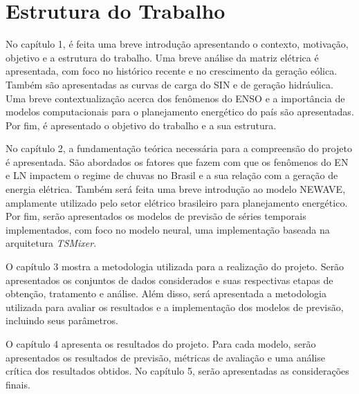 \section{Estrutura do Trabalho}
No capítulo 1, é feita uma breve introdução apresentando o contexto, motivação, objetivo e a estrutura do trabalho. Uma
breve análise da matriz elétrica é apresentada, com foco no histórico recente e no crescimento da geração eólica. Também
são apresentadas as curvas de carga do SIN e de geração hidráulica. Uma breve contextualização acerca dos fenômenos do
ENSO e a importância de modelos computacionais para o planejamento energético do país são apresentadas. Por fim, é apresentado
o objetivo do trabalho e a sua estrutura.

No capítulo 2, a fundamentação teórica necessária para a compreensão do projeto é apresentada. São abordados os fatores
que fazem com que os fenômenos do EN e LN impactem o regime de chuvas no Brasil e a sua relação com a geração de 
energia elétrica. Também será feita uma breve introdução ao modelo NEWAVE, amplamente utilizado pelo setor elétrico brasileiro 
para planejamento energético. Por fim, serão apresentados os modelos de previsão de séries temporais implementados, com foco no 
modelo neural, uma implementação baseada na arquitetura \textit{TSMixer}.

O capítulo 3 mostra a metodologia utilizada para a realização do projeto. Serão apresentados os conjuntos de dados
considerados e suas respectivas etapas de obtenção, tratamento e análise. Além disso, será apresentada a metodologia
utilizada para avaliar os resultados e a implementação dos modelos de previsão, incluindo seus parâmetros.

O capítulo 4 apresenta os resultados do projeto. Para cada modelo, serão apresentados os resultados de previsão, métricas 
de avaliação e uma análise crítica dos resultados obtidos. No capítulo 5, serão apresentadas as considerações finais.